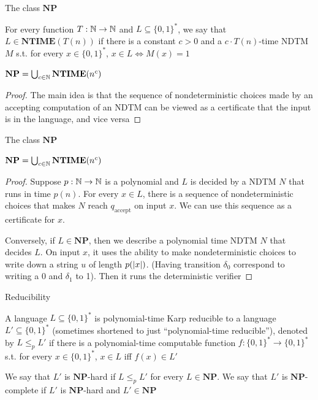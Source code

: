 \documentclass[presentation]{beamer}
\def \NTIME {\textbf{NTIME}}
\def \NP {\textbf{NP}}
\def \NP {\textbf{NP}}
\def \accept {\text{accept}}
\begin{document}
\begin{frame}[label={sec:org92c5dea}]{The class \texorpdfstring{\(\NP\)}{NP}}
\begin{definition}[]
For every function \(T:\mathbb{N}\to\mathbb{N}\) and \(L\subseteq\{0,1\}^*\), we say that \(L\in\NTIME(T(n))\) if there is a
constant \(c>0\) and a \(c\cdot T(n)\)-time NDTM \(M\) s.t. for
every \(x\in\{0,1\}^*\), \(x\in L\Leftrightarrow M(x)=1\)
\end{definition}

\begin{theorem}[]
\(\NP=\bigcup_{c\in\N}\NTIME(n^c)\)
\end{theorem}

\begin{proof}
The main idea is that the sequence of nondeterministic choices made by an accepting computation
of an NDTM  can be viewed as a certificate that the input is in the language, and vice versa
\end{proof}
\end{frame}
\begin{frame}[label={sec:org765f43c}]{The class \texorpdfstring{\(\NP\)}{NP}}
\begin{theorem}[]
\(\NP=\bigcup_{c\in\N}\NTIME(n^c)\)
\end{theorem}

\begin{proof}
Suppose \(p:\mathbb{N}\to\mathbb{N}\) is a polynomial and \(L\) is decided by a NDTM \(N\) that runs in
time \(p(n)\). For every \(x\in L\), there is a sequence of nondeterministic choices that
makes \(N\) reach \(q_{\accept}\) on input \(x\). We can use this sequence as a \alert{certificate}
for \(x\).

Conversely, if \(L\in\NP\), then we describe a polynomial time NDTM \(N\) that decides \(L\).
On input \(x\), it uses the ability to make nondeterministic choices to write down a
string \(u\) of length \(p(\abs{x})\). (Having transition \(\delta_0\) correspond to writing a
0 and \(\delta_1\) to 1). Then it runs the deterministic verifier
\end{proof}
\end{frame}
\begin{frame}[label={sec:orga630af9}]{Reducibility}
\begin{definition}[]
A language \(L\subseteq\{0,1\}^*\) is \alert{polynomial-time Karp reducible to a
language} \(L'\subseteq\{0,1\}^*\) (sometimes shortened to just ``polynomial-time reducible''), denoted
by \(L\le_p L'\) if there is a polynomial-time
computable function \(f:\{0,1\}^*\to\{0,1\}^*\) s.t. for every \(x\in\{0,1\}^*\),
\(x\in L\) iff \(f(x)\in L'\)

We say that \(L'\) is \alert{\(\NP\)-hard} if \(L\le_pL'\) for every \(L\in\NP\). We say that \(L'\)
is \alert{\(\NP\)-complete} if \(L'\) is \(\NP\)-hard and \(L'\in\NP\)
\end{definition}
\end{frame}
\end{document}
